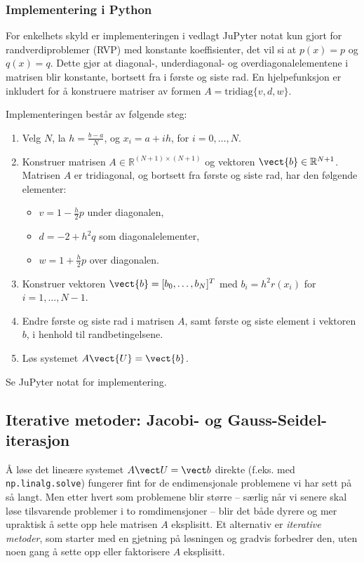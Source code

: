 \subsubsection*{Implementering i Python}
For enkelhets skyld er implementeringen i vedlagt JuPyter notat kun gjort for randverdiproblemer (RVP) med konstante koeffisienter, det vil si at \(p(x) = p\) og \(q(x) = q\). Dette gjør at diagonal-, underdiagonal- og overdiagonalelementene i matrisen blir konstante, bortsett fra i første og siste rad. En hjelpefunksjon er inkludert for å konstruere matriser av formen \(A = \text{tridiag}\{v, d, w\}\).

Implementeringen består av følgende steg:
\begin{enumerate}
    \item Velg \(N\), la \(h = \frac{b - a}{N}\), og \(x_i = a + ih\), for \(i = 0, \dots, N\).
    
    \item Konstruer matrisen \(A \in \mathbb{R}^{(N+1) \times (N+1)}\) og vektoren \(\vect{b} \in \mathbb{R}^{N+1}\). Matrisen \(A\) er tridiagonal, og bortsett fra første og siste rad, har den følgende elementer:
    \begin{itemize}
        \item \(v = 1 - \frac{h}{2}p\) under diagonalen,
        \item \(d = -2 + h^2q\) som diagonalelementer,
        \item \(w = 1 + \frac{h}{2}p\) over diagonalen.
    \end{itemize}
    \item Konstruer vektoren \(\vect{b} = [b_0, \dots, b_N]^T\) med \(b_i = h^2r(x_i)\) for \(i = 1, \dots, N - 1\).
    \item Endre første og siste rad i matrisen \(A\), samt første og siste element i vektoren \(b\), i henhold til randbetingelsene.
    \item Løs systemet \(A\vect{U} = \vect{b}\).
\end{enumerate}
Se JuPyter notat for implementering.

\subsection{Iterative metoder: Jacobi- og Gauss-Seidel-iterasjon}\label{sect:jacobigs}

Å løse det lineære systemet $A\vect U=\vect b$ direkte (f.eks. med \texttt{np.linalg.solve}) fungerer fint for de endimensjonale problemene vi har sett på så langt. Men etter hvert som problemene blir større -- særlig når vi senere skal løse tilsvarende problemer i to romdimensjoner -- blir det både dyrere og mer upraktisk å sette opp hele matrisen $A$ eksplisitt. Et alternativ er \emph{iterative metoder}, som starter med en gjetning på løsningen og gradvis forbedrer den, uten noen gang å sette opp eller faktorisere $A$ eksplisitt.

